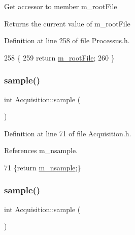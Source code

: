 Get accessor to member m\+\_\+root\+File \begin{DoxyReturn}{Returns}
the current value of m\+\_\+root\+File 
\end{DoxyReturn}


Definition at line 258 of file Processus.\+h.


\begin{DoxyCode}
258                      \{
259     \textcolor{keywordflow}{return} \hyperlink{classProcessus_a76114f8cf2111e910c323a7ae05a015d}{m\_rootFile};
260   \}
\end{DoxyCode}
\mbox{\label{classAcquisition_a83181975c0746e5837d53933031e7b62}} 
\subsubsection{\texorpdfstring{sample()}{sample()}\hspace{0.1cm}{\footnotesize\ttfamily [1/2]}}
{\footnotesize\ttfamily int Acquisition\+::sample (\begin{DoxyParamCaption}{ }\end{DoxyParamCaption})\hspace{0.3cm}{\ttfamily [inline]}}



Definition at line 71 of file Acquisition.\+h.



References m\+\_\+nsample.


\begin{DoxyCode}
71 \{\textcolor{keywordflow}{return} \hyperlink{classAcquisition_a26d0f1a44309ffac49c365b7ee568ab2}{m\_nsample};\}
\end{DoxyCode}
\mbox{\label{classAcquisition_a83181975c0746e5837d53933031e7b62}} 
\subsubsection{\texorpdfstring{sample()}{sample()}\hspace{0.1cm}{\footnotesize\ttfamily [2/2]}}
{\footnotesize\ttfamily int Acquisition\+::sample (\begin{DoxyParamCaption}{ }\end{DoxyParamCaption})\hspace{0.3cm}{\ttfamily [inline]}}




